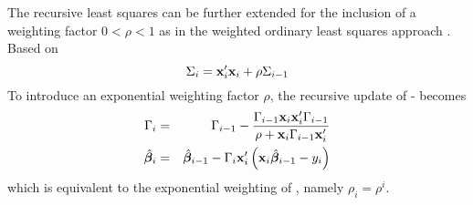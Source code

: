 The recursive least squares can be further extended for the inclusion of a weighting factor $0 < \rho < 1$ as in the weighted ordinary least squares approach . Based on 
\begin{equation}
    \Sigma_i = {\bf x}_i' {\bf x}_i + \rho\Sigma_{i-1}
\end{equation}
To introduce an exponential weighting factor $\rho$, the recursive update of - becomes
\begin{eqnarray}
    \Gamma_i & = & \Gamma_{i-1} - \frac{\Gamma_{i-1} {\bf x}_i {\bf x}_i' \Gamma_{i-1}}{\rho + {\bf x}_i\Gamma_{i-1}{\bf x}_i'} \label{EQ:RLS1} \\
    \hat{{{\bm \beta}}}_i & = & \hat{{{\bm \beta}}}_{i-1} - \Gamma_i {\bf x}_i' \left({\bf x}_i \hat{{{\bm \beta}}}_{i-1} - y_i\right) \label{EQ:RLS2}
\end{eqnarray}
which is equivalent to the exponential weighting of , namely $\rho_i = \rho^{i}$.


